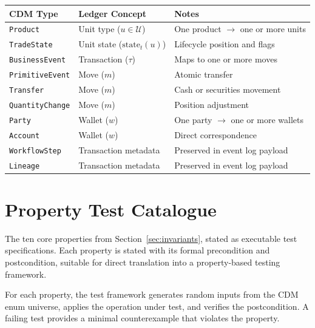 \documentclass[11pt,a4paper]{article}
\begin{document}
\begin{center}
\begin{tabular}{l l l}
\toprule
\textbf{CDM Type} & \textbf{Ledger Concept} & \textbf{Notes} \\
\midrule
\texttt{Product} & Unit type ($u \in \mathcal{U}$) & One product $\to$ one or more units \\
\texttt{TradeState} & Unit state ($\text{state}_t(u)$) & Lifecycle position and flags \\
\texttt{BusinessEvent} & Transaction ($\tau$) & Maps to one or more moves \\
\texttt{PrimitiveEvent} & Move ($m$) & Atomic transfer \\
\texttt{Transfer} & Move ($m$) & Cash or securities movement \\
\texttt{QuantityChange} & Move ($m$) & Position adjustment \\
\texttt{Party} & Wallet ($w$) & One party $\to$ one or more wallets \\
\texttt{Account} & Wallet ($w$) & Direct correspondence \\
\texttt{WorkflowStep} & Transaction metadata & Preserved in event log payload \\
\texttt{Lineage} & Transaction metadata & Preserved in event log payload \\
\bottomrule
\end{tabular}
\end{center}

\section{Property Test Catalogue}
\label{app:properties}

The ten core properties from Section~\ref{sec:invariants}, stated as executable test specifications. Each property is stated with its formal precondition and postcondition, suitable for direct translation into a property-based testing framework.

For each property, the test framework generates random inputs from the CDM enum universe, applies the operation under test, and verifies the postcondition. A failing test provides a minimal counterexample that violates the property.
\end{document}
